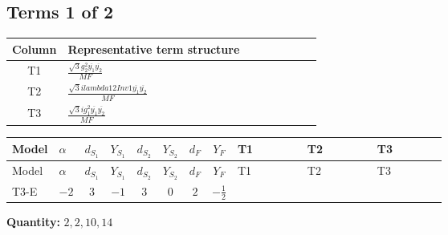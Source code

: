 \documentclass[8pt]{article}
\begin{document}
\begin{landscape}
\subsection*{Terms 1 of 2}
\begin{center}
\begin{tabular}{@{}c >{\raggedright\arraybackslash}p{0.82\linewidth}@{}}
\toprule
Column & Representative term structure \\
\midrule
T1 & \(\displaystyle \frac{\sqrt{3} g_{2}^{2} \overline{y_{1}} \overline{y_{2}}}{MF}\) \\
\midrule
T2 & \(\displaystyle \frac{\sqrt{3} i lambda12Inv1 \overline{y_{1}} \overline{y_{2}}}{MF}\) \\
\midrule
T3 & \(\displaystyle \frac{\sqrt{3} i g_{1}^{2} \overline{y_{1}} \overline{y_{2}}}{MF}\) \\
\midrule
\bottomrule
\end{tabular}
\end{center}
\smallskip
\tiny
\begin{longtable}{@{}llcccccc >{\raggedright\arraybackslash}p{0.21\linewidth} >{\raggedright\arraybackslash}p{0.21\linewidth} >{\raggedright\arraybackslash}p{0.21\linewidth}@{}}
\toprule
Model & $\alpha$ & $d_{S_1}$ & $Y_{S_1}$ & $d_{S_2}$ & $Y_{S_2}$ & $d_F$ & $Y_F$ & T1 & T2 & T3 \\
\midrule
\endfirsthead
\toprule
Model & $\alpha$ & $d_{S_1}$ & $Y_{S_1}$ & $d_{S_2}$ & $Y_{S_2}$ & $d_F$ & $Y_F$ & T1 & T2 & T3 \\
\midrule
\endhead
T3-E & $-2$ & $3$ & $-1$ & $3$ & $0$ & $2$ & $-\frac{1}{2}$ & \scriptsize\adjustbox{max width=\linewidth}{$\begin{gathered} - \frac{\sqrt{3} g_{2}^{2} \overline{y_{1}} \overline{y_{2}}}{6 MF}\end{gathered}$} & \scriptsize\adjustbox{max width=\linewidth}{$\begin{gathered} - \frac{\sqrt{3} i lambda12Inv1 \overline{y_{1}} \overline{y_{2}}}{6 MF}\end{gathered}$} & \scriptsize\adjustbox{max width=\linewidth}{$\begin{gathered} \frac{\sqrt{3} i g_{1}^{2} \overline{y_{1}} \overline{y_{2}}}{8 MF}\end{gathered}$} \\
\midrule
\bottomrule
\end{longtable}
\clearpage
\noindent\textbf{Quantity: }$\mathrm{2,2,10,14}$\par\smallskip

\end{landscape}
\end{document}
